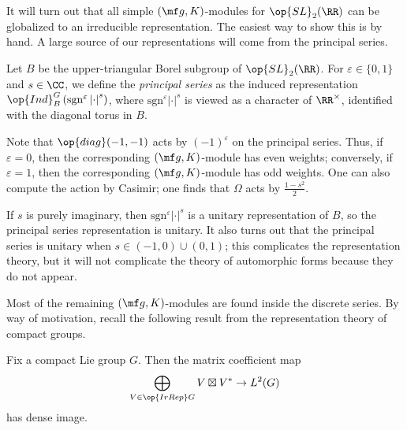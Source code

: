 \documentclass[../notes.tex]{subfiles}
\begin{document}
It will turn out that all simple $(\mf g,K)$-modules for $\op{SL}_2(\RR)$ can be globalized to an irreducible representation. The easiest way to show this is by hand. A large source of our representations will come from the principal series.
\begin{definition}
	Let $B$ be the upper-triangular Borel subgroup of $\op{SL}_2(\RR)$. For $\varepsilon\in\{0,1\}$ and $s\in\CC$, we define the \textit{principal series} as the induced representation $\op{Ind}_B^G\left(\mathrm{sgn}^\varepsilon\left|\cdot\right|^s\right)$, where $\mathrm{sgn}^\varepsilon\left|\cdot\right|^s$ is viewed as a character of $\RR^\times$, identified with the diagonal torus in $B$.
\end{definition}
\begin{remark}
	Note that $\op{diag}(-1,-1)$ acts by $(-1)^\varepsilon$ on the principal series. Thus, if $\varepsilon=0$, then the corresponding $(\mf g,K)$-module has even weights; conversely, if $\varepsilon=1$, then the corresponding $(\mf g,K)$-module has odd weights. One can also compute the action by Casimir; one finds that $\Omega$ acts by $\frac{1-s^2}2$.
\end{remark}
\begin{remark}
	If $s$ is purely imaginary, then $\mathrm{sgn}^\varepsilon\left|\cdot\right|^s$ is a unitary representation of $B$, so the principal series representation is unitary. It also turns out that the principal series is unitary when $s\in(-1,0)\cup(0,1)$; this complicates the representation theory, but it will not complicate the theory of automorphic forms because they do not appear.
\end{remark}
Most of the remaining $(\mf g,K)$-modules are found inside the discrete series. By way of motivation, recall the following result from the representation theory of compact groups.
\begin{theorem}
	Fix a compact Lie group $G$. Then the matrix coefficient map
	\[\bigoplus_{V\in\op{IrRep}G}V\boxtimes V^*\to L^2(G)\]
	has dense image.
\end{theorem}
\end{document}
